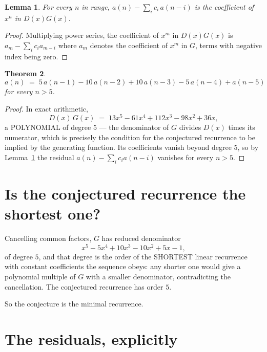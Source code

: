 \documentclass[11pt,a4paper]{article}
\theoremstyle{plain}
\newtheorem{theorem}{Theorem}
\newtheorem{lemma}[theorem]{Lemma}
\theoremstyle{definition}
\begin{document}
\begin{lemma}\label{lem:key}
For every $n$ in range, $a(n)-\sum_i c_i\,a(n-i)$ is the coefficient of $x^{n}$ in
$D(x)G(x)$.
\end{lemma}

\begin{proof}
Multiplying power series, the coefficient of $x^{m}$ in $D(x)G(x)$ is
$a_m-\sum_i c_i a_{m-i}$ where $a_m$ denotes the coefficient of $x^{m}$ in $G$, terms with
negative index being zero.
\end{proof}

\begin{theorem}
\[
a(n)\;=\;5\,a(n-1) - 10\,a(n-2) + 10\,a(n-3) - 5\,a(n-4) + a(n-5)
\]
for every $n>5$.
\end{theorem}

\begin{proof}
In exact arithmetic,
\[
D(x)\,G(x)\;=\;13 x^{5} - 61 x^{4} + 112 x^{3} - 98 x^{2} + 36 x,
\]
a POLYNOMIAL of degree $5$ --- the denominator of $G$ divides $D(x)$ times its numerator,
which is precisely the condition for the conjectured recurrence to be implied by the
generating function. Its coefficients vanish beyond degree $5$, so by
Lemma~\ref{lem:key} the residual $a(n)-\sum_ic_ia(n-i)$ vanishes for every
$n>5$.
\end{proof}

\section{Is the conjectured recurrence the shortest one?}

Cancelling common factors, $G$ has reduced denominator
\[
x^{5} - 5 x^{4} + 10 x^{3} - 10 x^{2} + 5 x - 1,
\]
of degree $5$, and that degree is the order of the SHORTEST linear recurrence with
constant coefficients the sequence obeys: any shorter one would give a polynomial multiple of
$G$ with a smaller denominator, contradicting the cancellation. The conjectured recurrence has
order $5$.

So the conjecture is the minimal recurrence.

\section{The residuals, explicitly}
\end{document}
